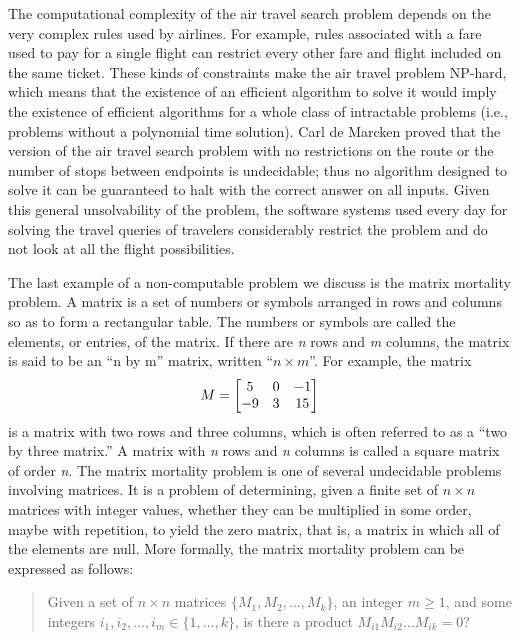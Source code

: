 The computational complexity of the air travel search problem depends on the very complex rules used by airlines. For example, rules associated with a fare used to pay for a single flight can restrict every other fare and flight included on the same ticket. These kinds of constraints make the air travel problem NP-hard, which means that the existence of an efficient algorithm to solve it would imply the existence of efficient algorithms for a whole class of intractable problems (i.e., problems without a polynomial time solution). Carl de Marcken proved that the version of the air travel search problem with no restrictions on the route or the number of stops between endpoints is undecidable; thus no algorithm designed to solve it can be guaranteed to halt with the correct answer on all inputs. Given this general unsolvability of the problem, the software systems used every day for solving the travel queries of travelers considerably restrict the problem and do not look at all the flight possibilities.

The last example of a non-computable problem we discuss is the matrix mortality problem. A matrix is a set of numbers or symbols arranged in rows and columns so as to form a rectangular table. The numbers or symbols are called the elements, or entries, of the matrix. If there are \textit{n} rows and \textit{m} columns, the matrix is said to be an ``n by m'' matrix, written ``$n \times m$''. For example, the matrix
\begin{equation*}
M=\left[\begin{array}{@{}ccc@{}}
 {5} & {0} & {-1} \\
 {-9} & {3} & {15}
 \end{array}\right]
\end{equation*}
is a matrix with two rows and three columns, which is often referred to as a ``two by three matrix.'' A matrix with \textit{n} rows and \textit{n} columns is called a square matrix of order \textit{n}. The matrix mortality problem is one of several undecidable problems involving matrices. It is a problem of determining, given a finite set of $n \times n$ matrices with integer values, whether they can be multiplied in some order, maybe with repetition, to yield the zero matrix, that is, a matrix in which all of the elements are null. More formally, the matrix mortality problem can be expressed as follows:

\begin{quote}
Given a set of $n \times n$ matrices $\{M_{1}, M_{2}, \ldots , M_{k}\}$, an integer $m \geq 1$, and some integers $i_{1},i_{2}, \ldots , i_{m} \in \{1, \ldots , k\}$, is there a product $M_{i1}M_{i2}\ldots M_{ik} = 0$?
\end{quote}

